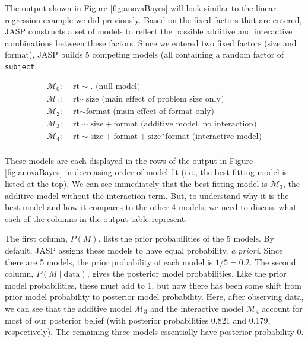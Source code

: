 \documentclass[english,,doc,floatsintext]{apa6}
\begin{document}
The output shown in Figure \ref{fig:anovaBayes} will look similar to the linear regression example we did previously. Based on the fixed factors that are entered, JASP constructs a set of models to reflect the possible additive and interactive combinations between these factors. Since we entered two fixed factors (size and format), JASP builds 5 competing models (all containing a random factor of \texttt{subject}:

\begin{align*}
  \mathcal{M}_0: & \text{ rt} \sim . \text{ (null model)}\\
  \mathcal{M}_1: & \text{ rt} \sim \text{size} \text{ (main effect of problem size only)}\\
  \mathcal{M}_2: & \text{ rt} \sim \text{format} \text{ (main effect of format only)}\\
  \mathcal{M}_3: & \text{ rt} \sim \text{size}+\text{format} \text{ (additive model, no interaction)}\\
  \mathcal{M}_4: & \text{ rt} \sim \text{size}+\text{format}+\text{size*format} \text{ (interactive model)}\\
\end{align*}

These models are each displayed in the rows of the output in Figure \ref{fig:anovaBayes} in decreasing order of model fit (i.e., the best fitting model is listed at the top). We can see immediately that the best fitting model is \(\mathcal{M}_3\), the additive model without the interaction term. But, to understand why it is the best model and how it compares to the other 4 models, we need to discuss what each of the columns in the output table represent.

The first column, \(P(M)\), lists the prior probabilities of the 5 models. By default, JASP assigns these models to have equal probability, \emph{a priori}. Since there are 5 models, the prior probability of each model is \(1/5 = 0.2\). The second column, \(P(M\mid \text{data})\), gives the posterior model probabilities. Like the prior model probabilities, these must add to 1, but now there has been some shift from prior model probability to posterior model probability. Here, after observing data, we can see that the additive model \(\mathcal{M}_3\) and the interactive model \(\mathcal{M}_4\) account for most of our posterior belief (with posterior probabilities 0.821 and 0.179, respectively). The remaining three models essentially have posterior probability 0.
\end{document}

